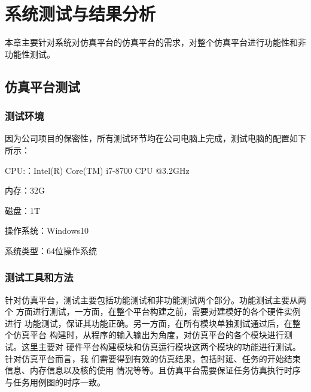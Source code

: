 
\chapter{系统测试与结果分析}

本章主要针对系统对仿真平台的仿真平台的需求，对整个仿真平台进行功能性和非功能性测试。
\section{仿真平台测试}

\subsection{测试环境}

因为公司项目的保密性，所有测试环节均在公司电脑上完成，测试电脑的配置如下所示：

CPU:：Intel(R) Core(TM) i7-8700 CPU @3.2GHz

内存：32G

磁盘：1T

操作系统：Windows10

系统类型：64位操作系统

\subsection{测试工具和方法}

针对仿真平台，测试主要包括功能测试和非功能测试两个部分。功能测试主要从两个
方面进行测试，一方面，在整个平台构建之前，需要对建模好的各个硬件实例进行
功能测试，保证其功能正确。另一方面，在所有模块单独测试通过后，在整个仿真平台
构建时，从程序的输入输出为角度，对仿真平台的各个模块进行测试。这里主要对
硬件平台构建模块和仿真运行模块这两个模块的功能进行测试。针对仿真平台而言，我
们需要得到有效的仿真结果，包括时延、任务的开始结束信息、内存信息以及核的使用
情况等等。且仿真平台需要保证任务仿真执行时序与任务用例图的时序一致。

